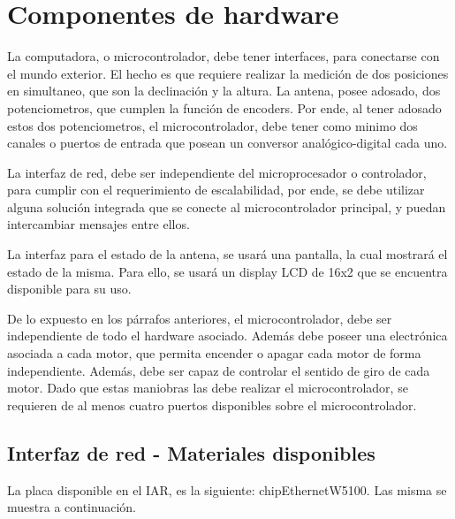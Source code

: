 \section{Componentes de hardware} \label{Sec_CompH}


La computadora, o microcontrolador, debe tener interfaces, para conectarse con el mundo exterior. El hecho es que requiere realizar la medición de dos posiciones en simultaneo, que son la declinación y la altura. La antena, posee adosado, dos potenciometros, que cumplen la función de encoders. Por ende, al tener adosado estos dos potenciometros, el microcontrolador, debe tener como minimo dos canales o puertos de entrada que posean un conversor analógico-digital cada uno. 

La interfaz de red, debe ser independiente del microprocesador o controlador, para cumplir con el requerimiento de escalabilidad, por ende, se debe utilizar alguna solución integrada que se conecte al microcontrolador principal, y puedan intercambiar mensajes entre ellos. 

La interfaz para el estado de la antena, se usará una pantalla, la cual mostrará el estado de la misma. Para ello, se usará un display LCD de 16x2 que se encuentra disponible para su uso.


De lo expuesto en los párrafos anteriores, el microcontrolador, debe ser independiente de todo el hardware asociado. Además debe poseer una electrónica asociada a cada motor, que permita encender o apagar cada motor de forma independiente. Además, debe ser capaz de controlar el sentido de giro de cada motor. Dado que estas maniobras las debe realizar el microcontrolador, se requieren de al menos cuatro puertos disponibles sobre el microcontrolador. 


\subsection{Interfaz de red - Materiales disponibles}\label{Int_r} 

La placa disponible en el IAR, es la siguiente: chipEthernetW5100. Las misma se muestra a continuación. 

